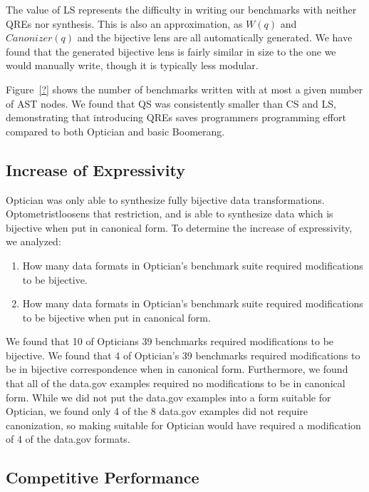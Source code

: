 \documentclass{svproc}
\newcommand{\canonizer}{\ensuremath{\mathit{Canonizer}}}
\newcommand{\Name}{Optometrist}
\newcommand{\QRESize}{QS}
\newcommand{\CanonizerAndSpecSize}{CS}
\newcommand{\LensAndSpecSize}{LS}
\begin{document}
The value of \LensAndSpecSize{} represents the difficulty in writing our benchmarks
with neither QREs nor synthesis.  This is also an approximation, as $W(q)$ and
$\canonizer(q)$ and the bijective lens are all automatically generated.
We have found that the generated bijective lens is fairly similar in size to the
one we would manually write, though it is typically less modular.

Figure~\ref{?} shows the number of benchmarks written with at most a given
number of AST nodes.  We found that \QRESize{} was consistently smaller than
\CanonizerAndSpecSize{} and \LensAndSpecSize{}, demonstrating that introducing
QREs saves programmers programming effort compared to both Optician and basic
Boomerang.

\subsection{Increase of Expressivity}

Optician was only able to synthesize fully bijective data transformations.
\Name loosens that restriction, and is able to synthesize data which is
bijective when put in canonical form.
To determine the increase of expressivity, we analyzed:
\begin{enumerate}
\item How many data formats in Optician's benchmark suite required modifications
  to be bijective.
\item How many data formats in Optician's benchmark suite required modifications
  to be bijective when put in canonical form.
\end{enumerate}

We found that 10 of Opticians 39 benchmarks required modifications to be
bijective. We found that 4 of Optician's 39
benchmarks required modifications to be in bijective correspondence when in
canonical form.  Furthermore, we found that all of the data.gov examples
required no modifications to be in canonical form.  While we did not put the
data.gov examples into a form suitable for Optician, we found only 4 of
the 8 data.gov examples did not require canonization, so making suitable
for Optician would have required a modification of 4 of the data.gov
formats.

\subsection{Competitive Performance}
\end{document}
